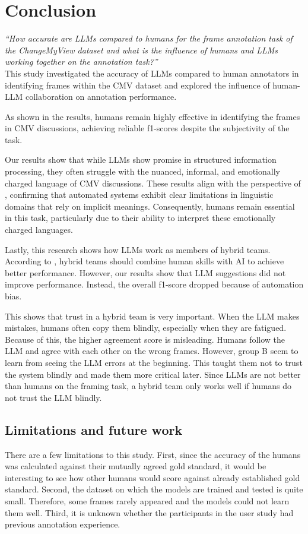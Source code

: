 \documentclass[
10pt, %
a4paper, %
oneside, %
headinclude,footinclude, %
] {book}%
\begin{document}
\chapter{Conclusion}
\textit{“How accurate are LLMs compared to humans for the frame annotation task of the ChangeMyView dataset and what is the influence of humans and LLMs working together on the annotation task?”}\\

This study investigated the accuracy of LLMs compared to human annotators in identifying frames within the CMV dataset and explored the influence of human-LLM collaboration on annotation performance.

As shown in the results, humans remain highly effective in identifying the frames in CMV discussions, achieving reliable f1-scores despite the subjectivity of the task. 

Our results show that while LLMs show promise in structured information processing, they often struggle with the nuanced, informal, and emotionally charged language of CMV discussions.  These results align with the perspective of \cite{wilkens2020artificial}, confirming that automated systems exhibit clear limitations in linguistic domains that rely on implicit meanings. Consequently, humans remain essential in this task, particularly due to their ability to interpret these emotionally charged languages. 

Lastly, this research shows how LLMs work as members of hybrid teams. According to \cite{richter2024hybrid}, hybrid teams should combine human skills with AI to achieve better performance. However, our results show that LLM suggestions did not improve performance. Instead, the overall f1-score dropped because of automation bias. 

This shows that trust in a hybrid team is very important. When the LLM makes mistakes, humans often copy them blindly, especially when they are fatigued. Because of this, the higher agreement score is misleading. Humans follow the LLM and agree with each other on the wrong frames. However, group B seem to learn from seeing the LLM errors at the beginning. This taught them not to trust the system blindly and made them more critical later. Since LLMs are not better than humans on the framing task, a hybrid team only works well if humans do not trust the LLM blindly.

\section{Limitations and future work}
There are a few limitations to this study. First, since the accuracy of the humans was calculated against their mutually agreed gold standard, it would be interesting to see how other humans would score against already established gold standard. Second, the dataset on which the models are trained and tested is quite small. Therefore, some frames rarely appeared and the models could not learn them well. Third, it is unknown whether the participants in the user study had previous annotation experience. 
\end{document}
